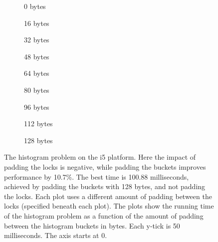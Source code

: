 \begin{figure}[hbpt]
	\graphicspath{{plots/}}
	\begin{subfigure}{0.32\textwidth}
		
		\caption{0 bytes}
	\end{subfigure}
	\begin{subfigure}{0.32\textwidth}
		
		\caption{16 bytes}
	\end{subfigure}
	\begin{subfigure}{0.32\textwidth}
		
		\caption{32 bytes}
	\end{subfigure}
	\begin{subfigure}{0.32\textwidth}
		
		\caption{48 bytes}
	\end{subfigure}
	\begin{subfigure}{0.32\textwidth}
		
		\caption{64 bytes}
	\end{subfigure}
	\begin{subfigure}{0.32\textwidth}
		
		\caption{80 bytes}
	\end{subfigure}
	\begin{subfigure}{0.32\textwidth}
		
		\caption{96 bytes}
	\end{subfigure}
	\begin{subfigure}{0.32\textwidth}
		
		\caption{112 bytes}
	\end{subfigure}
	\begin{subfigure}{0.32\textwidth}
		
		\caption{128 bytes}
	\end{subfigure}
	\caption{The histogram problem on the i5 platform. Here the impact of
	padding the locks is negative, while padding the buckets improves
	performance by 10.7\%. The best time is 100.88 milliseconds, achieved by
	padding the buckets with 128 bytes, and not padding the locks.
	Each plot uses a different amount of padding between the locks
	(specified beneath each plot). The plots show the running time of the
	histogram problem as a function of the amount of padding between the
	histogram buckets in bytes. Each y-tick is 50 milliseconds. The axis
	starts at 0.}
	\label{fig:histo-i5}
\end{figure}

